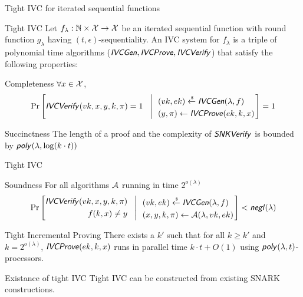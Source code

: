 \documentclass[UTF8]{beamer}
\begin{document}
	\begin{frame}{Tight IVC for iterated sequential functions}
		\begin{block}{Tight IVC}
			Let $f_\lambda:\mathbb{N}\times\mathcal{X}\to\mathcal{X}$ be an iterated sequential function with round function $g_\lambda$ having $(t,\epsilon)$-sequentiality. An IVC system for $f_\lambda$ is a triple of polynomial time algorithms ($\textsf{\textit{IVCGen}},\textsf{\textit{IVCProve}},\textsf{\textit{IVCVerify}}$) that satisfy the following properties:
		\end{block}
		\begin{block}{Completeness}
			$\forall x\in\mathcal{X}$,
			\begin{equation*}
				\Pr\left[
				\textsf{\textit{IVCVerify}}(vk,x,y,k,\pi)=1
				~~\left|~~
				\begin{aligned}
					&(vk,ek)\xleftarrow{\text{\tiny$\mathsf{\$}$}}\textsf{\textit{IVCGen}}(\lambda,f)\\
					&(y,\pi)\gets\textsf{\textit{IVCProve}}(ek,k,x)
				\end{aligned}
				\right.\right]=1
			\end{equation*}
		\end{block}
		\begin{block}{Succinctness}
			The length of a proof and the complexity of $\textsf{\textit{SNKVerify}}$ is bounded by $\textsf{\textit{poly}}(\lambda,\log(k\cdot t))$
		\end{block}
	\end{frame}

	\begin{frame}{Tight IVC}
		\begin{block}{Soundness}
			For all algorithms $\mathcal{A}$ running in time $2^{o(\lambda)}$
			\begin{equation*}
				\Pr\left[
				\begin{aligned}
					\textsf{\textit{IVCVerify}}(vk,x,y,k,\pi)\\
					f(k,x)\neq y
				\end{aligned}
				~~\left|~~
				\begin{aligned}
					&(vk,ek)\xleftarrow{\text{\tiny$\mathsf{\$}$}}\textsf{\textit{IVCGen}}(\lambda,f)\\
					&(x,y,k,\pi)\gets\mathcal{A}(\lambda,vk,ek)
				\end{aligned}
				\right.\right]<\textsf{\textit{negl}}(\lambda)
			\end{equation*}
		\end{block}
		\begin{block}{Tight Incremental Proving}
			There exists a $k'$ such that for all $k\geq k'$ and $k=2^{o(\lambda)}$, $\textsf{\textit{IVCProve}}(ek,k,x)$ runs in parallel time $k\cdot t+O(1)$ using $\textsf{\textit{poly}}(\lambda,t)$-processors.
		\end{block}
		\begin{block}{Existance of tight IVC}
			Tight IVC can be constructed from existing SNARK constructions.
		\end{block}
	\end{frame}
\end{document}

